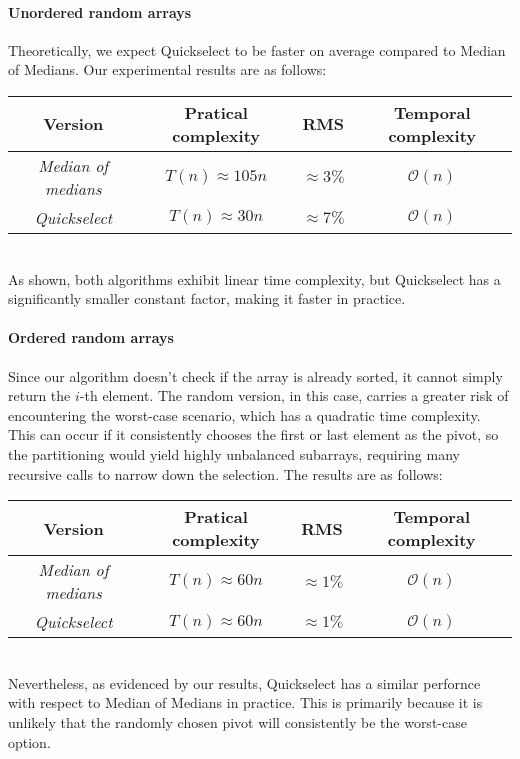 \documentclass[paper=a4, fontsize=12pt]{scrartcl}
\numberwithin{equation}{section}
\numberwithin{figure}{section}
\numberwithin{table}{section}
\begin{document}
    \paragraph{Unordered random arrays}
    Theoretically, we expect Quickselect to be faster on average compared to Median of Medians.
    Our experimental results are as follows:
    \begin{table}[!ht]
        \centering
        \begin{tabular}{|c|c|c|c|}
        \hline
        \textbf{Version}  & \textbf{Pratical complexity} & \textbf{RMS} & \textbf{Temporal complexity}      \\ \hline
        \textit{Median of medians} & $T(n) \approx 105n$      &             $\approx 3\%$                & $\mathcal{O}(n)$             \\
        \textit{Quickselect}   & $T(n) \approx 30n$       &           $\approx 7\%$                  & $\mathcal{O}(n)$             \\ \hline
        \end{tabular}
    \end{table}\\
    As shown, both algorithms exhibit linear time complexity, but Quickselect has a significantly smaller constant factor, making it faster in practice.

    \paragraph{Ordered random arrays}
    Since our algorithm doesn't check if the array is already sorted, it cannot simply return the $i$-th element.
    The random version, in this case, carries a greater risk of encountering the worst-case scenario, which has a quadratic time complexity. 
    This can occur if it consistently chooses the first or last element as the pivot, so the partitioning would yield highly unbalanced subarrays, requiring many recursive calls to narrow down the selection.
    The results are as follows:
    \begin{table}[!ht]
        \centering
        \begin{tabular}{|c|c|c|c|}
        \hline
        \textbf{Version}  & \textbf{Pratical complexity} & \textbf{RMS} & \textbf{Temporal complexity}      \\ \hline
        \textit{Median of medians} & $T(n) \approx 60n$     &         $\approx 1\%$                     & $\mathcal{O}(n)$             \\
        \textit{Quickselect}   & $T(n) \approx 60n$    &          $\approx 1\%$                    & $\mathcal{O}(n)$             \\ \hline
        \end{tabular}
    \end{table} \\
    Nevertheless, as evidenced by our results, Quickselect has a similar perfornce with respect to Median of Medians in practice. 
    This is primarily because it is unlikely that the randomly chosen pivot will consistently be the worst-case option.
\end{document}
